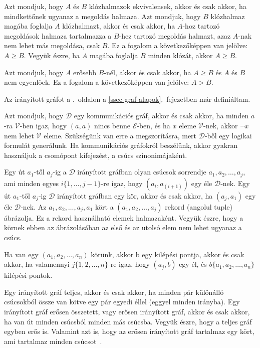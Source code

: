 \documentclass[
]{thesis-ekf}
\theoremstyle{definition}
\theoremstyle{remark}
\begin{document}
	Azt mondjuk, hogy $ A $ és $ B $ klózhalmazok ekvivalensek, akkor és csak akkor, ha mindkettőnek ugyanaz a megoldás halmaza. Azt mondjuk, hogy $ B $ klózhalmaz magába foglalja $ A $ klózhalmazt, akkor és csak akkor, ha $ A $-hoz tartozó megoldások halmaza tartalmazza a $ B $-hez tartozó megoldás halmazt, azaz $ A $-nak nem lehet más megoldása, csak $ B $. Ez a fogalom a következőképpen van jelölve: $ A\geq B $. Vegyük észre, ha $ A $ magába foglalja $ B $ minden klózát, akkor $ A\geq B $.

	Azt mondjuk, hogy $ A $ erősebb $ B $-nél, akkor és csak akkor, ha $ A\geq B $ és $ A $ és $ B $ nem egyenlőek. Ez a fogalom a következőképpen van jelölve: $ A>B $.

	Az irányított gráfot a \pageref{ssec-graf-alapok}.~oldalon a \ref{ssec-graf-alapok}.~fejezetben már definiáltam.
	
	Azt mondjuk, hogy $ \mathcal{D} $ egy kommunikációs gráf, akkor és csak akkor, ha minden $ a $-ra $ \mathcal{V} $-ben igaz, hogy $ (a,a) $ nincs benne $ \mathcal{E} $-ben, és ha $ x $ eleme $ \mathcal{V} $-nek, akkor $ \neg x $ nem lehet $ \mathcal{V} $ eleme. Szükségünk van erre a megszorításra, mert $ \mathcal{D} $-ből egy logikai formulát generálunk. Ha kommunikációs gráfokról beszélünk, akkor gyakran használjuk a csomópont kifejezést, a csúcs szinonimájaként.

	Egy út $ a_1 $-től $ a_j $-ig a $ \mathcal{D} $ irányított gráfban olyan csúcsok sorrendje $ a_1,a_2,\dots,a_j $, ami minden egyes $ i\{1,\dots,j-1\} $-re igaz, hogy $ (a_i,a_(i+1)) $ egy éle $ \mathcal{D} $-nek. Egy út $ a_1 $-től $ a_j $-ig $ \mathcal{D} $ irányított gráfban egy kör, akkor és csak akkor, ha $ (a_j,a_1) $ egy éle $ \mathcal{D} $-nek. Az $ a_1,a_2,\dots,a_j,a_1 $ kört a $ (a_1,a_2,\dots,a_j ) $ rekord (angolul tuple) ábrázolja. Ez a rekord használható elemek halmazaként. Vegyük észre, hogy a körnek ebben az ábrázolásában az első és az utolsó elem nem lehet ugyanaz a csúcs.

	Ha van egy $ (a_1,a_2,\dots,a_n) $ körünk, akkor b egy kilépési pontja, akkor és csak akkor, ha valamennyi $ j\{1,2,\dots,n\} $-re igaz, hogy $ (a_j,b) $ egy él, és $ b\{a_1,a_2,\dots,a_n\} $ kilépési pontok.

	Egy irányított gráf teljes, akkor és csak akkor, ha minden pár különálló csúcsokból össze van kötve egy pár egyedi éllel (eggyel minden irányba). Egy irányított gráf erősen összetett, vagy erősen irányított gráf, akkor és csak akkor, ha van út minden csúcsból minden más csúcsba. Vegyük észre, hogy a teljes gráf egyben erős is. Valamint azt is, hogy az erősen irányított gráf tartalmaz egy kört, ami tartalmaz minden csúcsot~\cite[fordítás Kusper Gábor és társainak cikkjéből]{am}.
\end{document}
